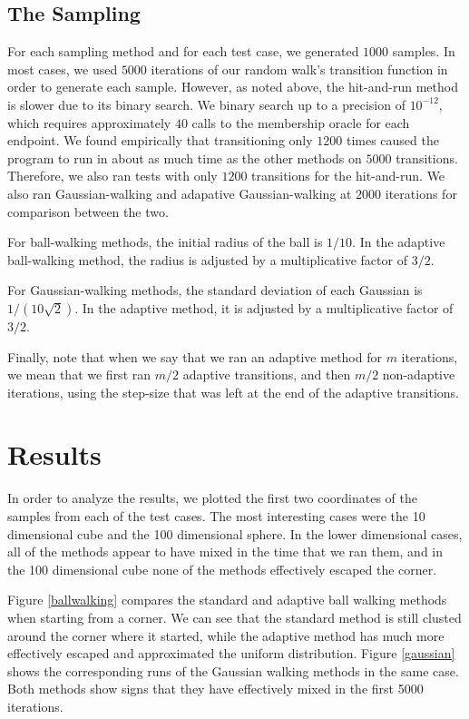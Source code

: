 \documentclass[11pt]{article}
\begin{document}
\subsection{The Sampling}

For each sampling method and for each test case, we generated $1000$ samples. In most cases, we used $5000$ iterations of our random walk's transition function in order to generate each sample. However, as noted above, the hit-and-run method is slower due to its binary search. We binary search up to a precision of $10^{-12}$, which requires approximately $40$ calls to the membership oracle for each endpoint. We found empirically that transitioning only $1200$ times caused the program to run in about as much time as the other methods on $5000$ transitions. Therefore, we also ran tests with only $1200$ transitions for the hit-and-run. We also ran Gaussian-walking and adapative Gaussian-walking at $2000$ iterations for comparison between the two.

For ball-walking methods, the initial radius of the ball is $1/10$. In the adaptive ball-walking method, the radius is adjusted by a multiplicative factor of $3/2$.

For Gaussian-walking methods, the standard deviation of each Gaussian is $1/(10\sqrt{2})$. In the adaptive method, it is adjusted by a multiplicative factor of $3/2$.

Finally, note that when we say that we ran an adaptive method for $m$ iterations, we mean that we first ran $m/2$ adaptive transitions, and then $m/2$ non-adaptive iterations, using the step-size that was left at the end of the adaptive transitions.

\section{Results}

In order to analyze the results, we plotted the first two coordinates of the samples from each of the test cases. The most interesting cases were the 10 dimensional cube and the 100 dimensional sphere. In the lower dimensional cases, all of the methods appear to have mixed in the time that we ran them, and in the 100 dimensional cube none of the methods effectively escaped the corner.

Figure \ref{ballwalking} compares the standard and adaptive ball walking methods when starting from a corner. We can see that the standard method is still clusted around the corner where it started, while the adaptive method has much more effectively escaped and approximated the uniform distribution.
Figure \ref{gaussian} shows the corresponding runs of the Gaussian walking methods in the same case. Both methods show signs that they have effectively mixed in the first 5000 iterations.
\end{document}
